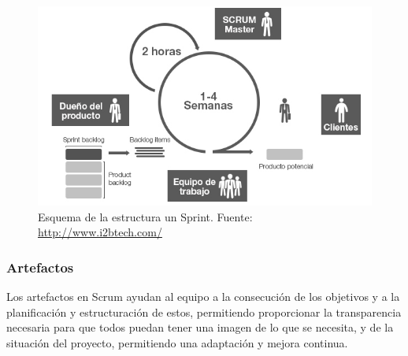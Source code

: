 \begin{figure}[!h]
\begin{center}
\includegraphics[width=1\textwidth]{./figures/scrum-framework.jpg}
\caption{Esquema de la estructura un Sprint. Fuente: \href{http://www.i2btech.com/}{http://www.i2btech.com/}}
\label{fig:scrum-framework}
\end{center}
\end{figure}

\subsubsection{Artefactos}

Los artefactos en Scrum ayudan al equipo a la consecución de los objetivos y a la planificación y estructuración de estos, permitiendo proporcionar la transparencia necesaria para que todos puedan tener una imagen de lo que se necesita, y de la situación del proyecto, permitiendo una adaptación y mejora continua.


